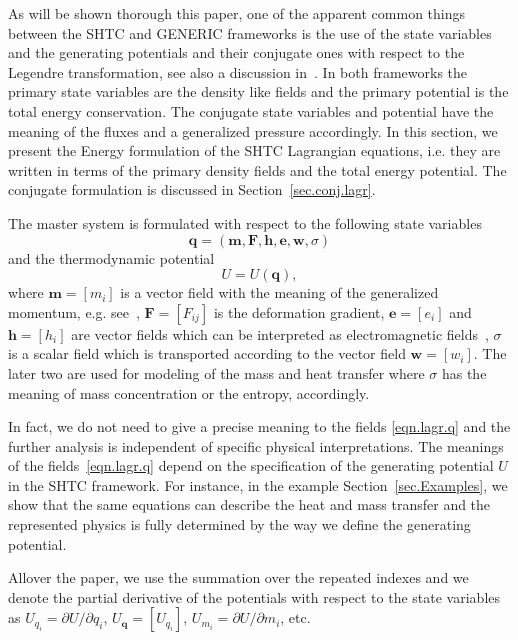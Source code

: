 \documentclass[twoside]{article}
\newcommand{\ww}{{\boldsymbol{w}}}
\newcommand{\mm}{{\boldsymbol{m}}}
\newcommand{\qq}{{\boldsymbol{q}}}
\newcommand{\ee}{{\boldsymbol{e}}}
\newcommand{\hh}{{\boldsymbol{h}}}
\newcommand{\FF}{{\boldsymbol{F}}}
\newcommand{\pd}{\partial}
\begin{document}
As will be shown thorough this paper, one of the apparent common things 
between the SHTC and 
GENERIC frameworks is the 
use of the state variables and the generating potentials and their conjugate 
ones with respect to the Legendre transformation, see also a discussion 
in~\cite{PeshGrmRom2015}. In both frameworks the primary state variables are 
the 
density like fields and the primary potential is the total energy conservation. 
The conjugate state variables and potential have the meaning of the fluxes and 
a generalized pressure accordingly. In this section, we present 
the Energy formulation of the SHTC Lagrangian equations, i.e. they are written 
in terms of the primary density fields and the total energy potential. The 
conjugate formulation is discussed in Section~\ref{sec.conj.lagr}.

The master system is formulated with respect to the following state variables
\begin{equation}\label{eqn.lagr.q}
\qq=(\mm,\FF,\hh,\ee,\ww,\sigma)
\end{equation}
and the thermodynamic potential
\begin{equation}\label{eqn.lagr.U}
U = U(\qq),
\end{equation}
where $ \mm=[m_i] $ is a vector field with the meaning of the generalized 
momentum, e.g. see~\cite{DPRZ2017}, $ \FF=[F_{ij}] $ is the deformation 
gradient, $ \ee=[e_i] $ and $ \hh=[h_i] $ are vector fields which can be 
interpreted as electromagnetic fields~\cite{DPRZ2017}, $ \sigma $ is a 
scalar 
field which is transported according to the vector field $ \ww=[w_i] $. The 
later two are used for modeling of the mass and heat transfer where $ \sigma $ 
has 
the meaning of mass concentration or the entropy, accordingly. 

In fact, we do not need to give a precise meaning to the fields 
\eqref{eqn.lagr.q} and the further analysis is independent of specific physical 
interpretations. The meanings of the fields~\eqref{eqn.lagr.q}  depend on the 
specification of the generating potential $ U $ in the SHTC framework. For 
instance, in the example 
Section~\ref{sec.Examples}, we show that the same equations can 
describe the heat and mass transfer and the represented physics is fully 
determined by the way we define the generating potential. 

Allover the paper, we use the summation over the repeated indexes and we denote 
the partial derivative of the potentials with respect to the state variables as 
$ U_{q_i} = \pd U/\pd q_i $, $ U_\qq=[U_{q_i}] $, $ U_{m_{i}} = \pd U/\pd m_{i} 
$, etc.
\end{document}
